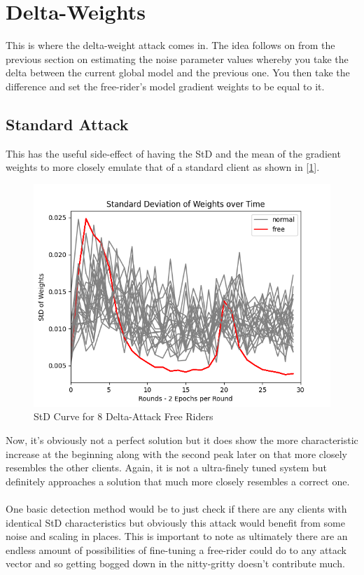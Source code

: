 \section{Delta-Weights}
This is where the delta-weight attack comes in.
The idea follows on from the previous section on estimating the noise parameter values whereby you take the delta between the current global model and the previous one.
You then take the difference and set the free-rider's model gradient weights to be equal to it.

\subsection{Standard Attack}

This has the useful side-effect of having the StD and the mean of the gradient weights to more closely emulate that of a standard client as shown in [\ref{fig:std_delta}].
\begin{figure}[htbp]
	\centering
    \includegraphics[scale=0.5]{free_riders/graphs/delta8.png}
	\caption{StD Curve for 8 Delta-Attack Free Riders}
	\label{fig:std_delta}
\end{figure}
Now, it's obviously not a perfect solution but it does show the more characteristic increase at the beginning along with the second peak later on that more closely resembles the other clients.
Again, it is not a ultra-finely tuned system but definitely approaches a solution that much more closely resembles a correct one.
\\ \\ 
One basic detection method would be to just check if there are any clients with identical StD characteristics but obviously this attack would benefit from some noise and scaling in places.
This is important to note as ultimately there are an endless amount of possibilities of fine-tuning a free-rider could do to any attack vector and so getting bogged down in the nitty-gritty doesn't contribute much.


